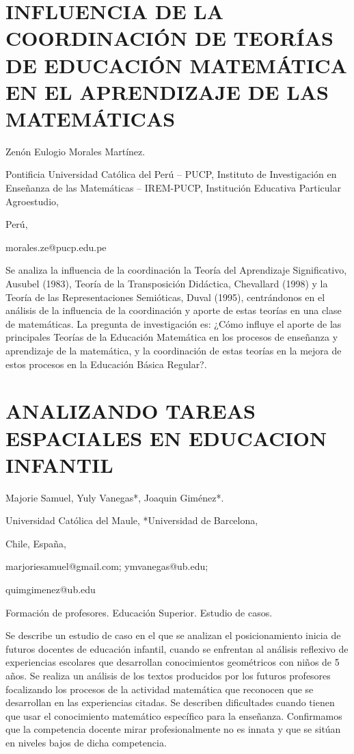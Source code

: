 \section{INFLUENCIA DE LA COORDINACIÓN DE TEORÍAS DE EDUCACIÓN MATEMÁTICA
EN EL APRENDIZAJE DE LAS MATEMÁTICAS}

\begin{datos}

Zenón Eulogio Morales Martínez.

Pontificia Universidad Católica del Perú – PUCP, Instituto de Investigación
en Enseñanza de las Matemáticas – IREM-PUCP, Institución Educativa
Particular Agroestudio,

Perú,

morales.ze@pucp.edu.pe

\end{datos}

Se analiza la influencia de la coordinación la Teoría del Aprendizaje
Significativo, Ausubel (1983), Teoría de la Transposición Didáctica,
Chevallard (1998) y la Teoría de las Representaciones Semióticas,
Duval (1995), centrándonos en el análisis de la influencia de la coordinación
y aporte de estas teorías en una clase de matemáticas. La pregunta
de investigación es: ¿Cómo influye el aporte de las principales Teorías
de la Educación Matemática en los procesos de enseñanza y aprendizaje
de la matemática, y la coordinación de estas teorías en la mejora
de estos procesos en la Educación Básica Regular?.


\section{ANALIZANDO TAREAS ESPACIALES EN EDUCACION INFANTIL}

\begin{datos}

Majorie Samuel, Yuly Vanegas{*}, Joaquin Giménez{*}.

Universidad Católica del Maule, {*}Universidad de Barcelona, 

Chile, España,

marjoriesamuel@gmail.com; ymvanegas@ub.edu; 

quimgimenez@ub.edu

\end{datos}

Formación de profesores. Educación Superior. Estudio de casos.

Se describe un estudio de caso en el que se analizan el posicionamiento
inicia de futuros docentes de educación infantil, cuando se enfrentan
al análisis reflexivo de experiencias escolares que desarrollan conocimientos
geométricos con niños de 5 años. Se realiza un análisis de los textos
producidos por los futuros profesores focalizando los procesos de
la actividad matemática que reconocen que se desarrollan en las experiencias
citadas. Se describen dificultades cuando tienen que usar el conocimiento
matemático específico para la enseñanza. Confirmamos que la competencia
docente \textquotedbl{}mirar profesionalmente\textquotedbl{} no es
innata y que se sitúan en niveles bajos de dicha competencia.


